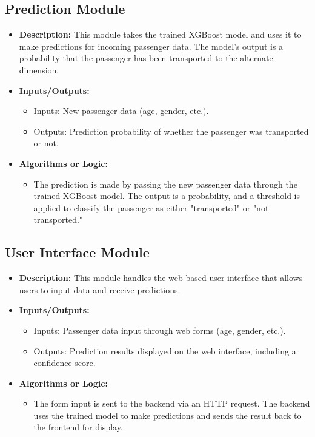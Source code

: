 \documentclass[15pt]{article}
\begin{document}
\subsection{Prediction Module}
\begin{itemize}
    \item \textbf{Description:} This module takes the trained XGBoost model and uses it to make predictions for incoming passenger data. The model's output is a probability that the passenger has been transported to the alternate dimension.
    \item \textbf{Inputs/Outputs:} 
    \begin{itemize}
        \item Inputs: New passenger data (age, gender, etc.).
        \item Outputs: Prediction probability of whether the passenger was transported or not.
    \end{itemize}
    \item \textbf{Algorithms or Logic:} 
    \begin{itemize}
        \item The prediction is made by passing the new passenger data through the trained XGBoost model. The output is a probability, and a threshold is applied to classify the passenger as either "transported" or "not transported."
    \end{itemize}
\end{itemize}

\subsection{User Interface Module}
\begin{itemize}
    \item \textbf{Description:} This module handles the web-based user interface that allows users to input data and receive predictions.
    \item \textbf{Inputs/Outputs:} 
    \begin{itemize}
        \item Inputs: Passenger data input through web forms (age, gender, etc.).
        \item Outputs: Prediction results displayed on the web interface, including a confidence score.
    \end{itemize}
    \item \textbf{Algorithms or Logic:} 
    \begin{itemize}
        \item The form input is sent to the backend via an HTTP request. The backend uses the trained model to make predictions and sends the result back to the frontend for display.
    \end{itemize}
\end{itemize}
\end{document}
